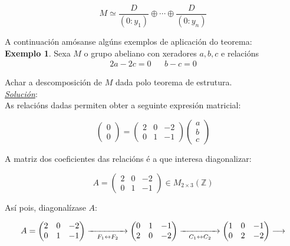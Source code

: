 \documentclass[twoside]{report}
\theoremstyle{mystyle}
\begin{document}
$$M \simeq \displaystyle \frac{D}{(0: y_{1})} \oplus \cdots \oplus \frac{D}{(0:y_{n})}$$

\vspace{5mm}

\noindent A continuación amósanse algúns exemplos de aplicación do teorema:\\

\noindent \textbf{Exemplo 1}. Sexa $M$ o grupo abeliano con xeradores $a,b,c$ e relacións
    \begin{align*}
        2a - 2c = 0 & & b-c = 0
    \end{align*}
    
\noindent Achar a descomposición de $M$ dada polo teorema de estrutura.\\

\noindent \textit{\underline{Solución}}:\\

\noindent As relacións dadas permiten obter a seguinte expresión matricial:

$$
\begin{pmatrix}
0 \\ 0 
\end{pmatrix}
=
\begin{pmatrix}
2 & 0 & -2 \\
0 & 1 & -1
\end{pmatrix}
\begin{pmatrix}
a \\ b \\ c
\end{pmatrix}
$$

\noindent A matriz dos coeficientes das relacións é a que interesa diagonalizar:

$$
A = \begin{pmatrix}
2 & 0 & -2 \\
0 & 1 & -1
\end{pmatrix}
\in M_{2 \times 3}(\mathbb{Z})
$$

\noindent Así pois, diagonalízase $A$:

$$
A = \begin{pmatrix}
2 & 0 & -2 \\
0 & 1 & -1
\end{pmatrix}
\underset{F_{1} \leftrightarrow F_{2}}{\xrightarrow{\hspace{15mm}}}
\begin{pmatrix}
0 & 1 & -1 \\
2 & 0 & -2
\end{pmatrix}
\underset{C_{1} \leftrightarrow C_{2}}{\xrightarrow{\hspace{15mm}}}
\begin{pmatrix}
1 & 0 & -1 \\
0 & 2 & -2
\end{pmatrix}
\longrightarrow
$$
\end{document}

